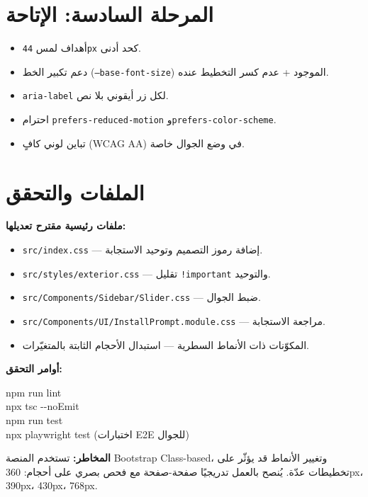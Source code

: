 \documentclass[11pt]{article}
\begin{document}
\section{المرحلة السادسة: الإتاحة}

\begin{itemize}
  \item أهداف لمس \texttt{44px} كحد أدنى.
  \item دعم تكبير الخط (\texttt{--base-font-size}) الموجود + عدم كسر التخطيط عنده.
  \item \texttt{aria-label} لكل زر أيقوني بلا نص.
  \item احترام \texttt{prefers-reduced-motion} و\texttt{prefers-color-scheme}.
  \item تباين لوني كافٍ (WCAG AA) في وضع الجوال خاصة.
\end{itemize}

\section{الملفات والتحقق}

\textbf{ملفات رئيسية مقترح تعديلها:}
\begin{itemize}
  \item \texttt{src/index.css} — إضافة رموز التصميم وتوحيد الاستجابة.
  \item \texttt{src/styles/exterior.css} — تقليل \texttt{!important} والتوحيد.
  \item \texttt{src/Components/Sidebar/Slider.css} — ضبط الجوال.
  \item \texttt{src/Components/UI/InstallPrompt.module.css} — مراجعة الاستجابة.
  \item المكوّنات ذات الأنماط السطرية — استبدال الأحجام الثابتة بالمتغيّرات.
\end{itemize}

\vspace{6pt}
\textbf{أوامر التحقق:}
\begin{codebox}
{\ttfamily\small\raggedleft
npm run lint\\
npx tsc -{}-noEmit\\
npm run test\\
npx playwright test   (اختبارات E2E للجوال)
}
\end{codebox}

\begin{warnbox}
\textbf{المخاطر:} تستخدم المنصة Bootstrap Class-based، وتغيير الأنماط قد يؤثّر على تخطيطات عدّة.
يُنصح بالعمل تدريجيًا صفحة-صفحة مع فحص بصري على أحجام: 360px، 390px، 430px، 768px.
\end{warnbox}
\end{document}
